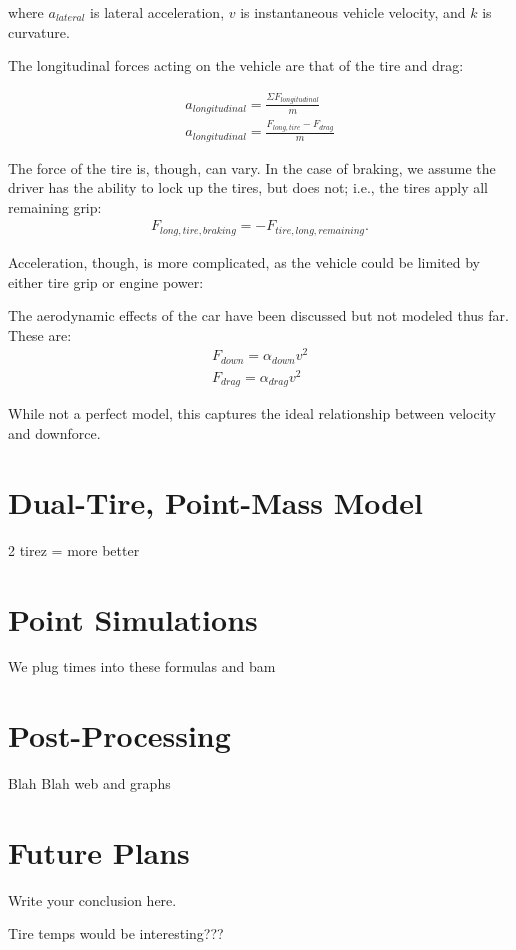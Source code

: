 \documentclass{article}
\begin{document}
where $a_{lateral}$ is lateral acceleration, $v$ is instantaneous vehicle velocity, and $k$ is curvature.


%

The longitudinal forces acting on the vehicle are that of the tire and drag:

\begin{align}
    a_{longitudinal} = \frac{\Sigma F_{longitudinal}}{m}\\
    a_{longitudinal} = \frac{F_{long,tire} - F_{drag} }{m} \label{eq_accel}
\end{align}

The force of the tire is, though, can vary. In the case of braking, we assume the driver has the ability to lock up the tires, but does not; i.e., the tires apply all remaining grip: 
\begin{align}
F_{long,tire,braking} = -F_{tire,long,remaining}. \label{eq_accel_brake}
\end{align}

Acceleration, though, is more complicated, as the vehicle could be limited by either tire grip or engine power:



The aerodynamic effects of the car have been discussed but not modeled thus far. These are:
\begin{align}
    F_{down} = \alpha_{down} v^2 \\
    F_{drag} = \alpha_{drag} v^2
\end{align}

While not a perfect model, this captures the ideal relationship between velocity and downforce.


\section{Dual-Tire, Point-Mass Model}
2 tirez = more better

\section{Point Simulations}
We plug times into these formulas and bam

\section{Post-Processing}
Blah Blah web and graphs

\section{Future Plans}
Write your conclusion here.

Tire temps would be interesting???
\end{document}
